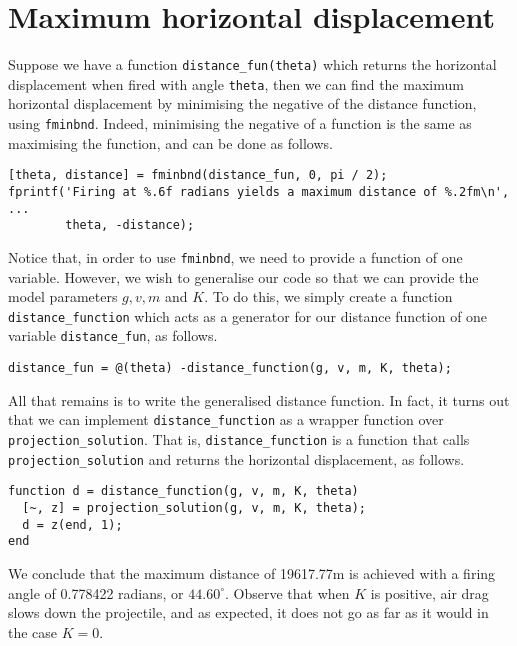 
\newpage
\section{Maximum horizontal displacement}

Suppose we have a function \lstinline|distance_fun(theta)| which returns the horizontal displacement when fired with angle \lstinline|theta|, then we can find the maximum horizontal displacement by minimising the negative of the distance function, using \lstinline|fminbnd|. Indeed, minimising the negative of a function is the same as maximising the function, and can be done as follows.

\begin{lstlisting}
[theta, distance] = fminbnd(distance_fun, 0, pi / 2);
fprintf('Firing at %.6f radians yields a maximum distance of %.2fm\n', ...
        theta, -distance);
\end{lstlisting}

\noindent
Notice that, in order to use \lstinline|fminbnd|, we need to provide a function of one variable. However, we wish to generalise our code so that we can provide the model parameters $g, v, m$ and $K$. To do this, we simply create a function \lstinline|distance_function| which acts as a generator for our distance function of one variable \lstinline|distance_fun|, as follows.
\begin{lstlisting}
distance_fun = @(theta) -distance_function(g, v, m, K, theta);
\end{lstlisting}

\noindent
All that remains is to write the generalised distance function. In fact, it turns out that we can implement \lstinline|distance_function| as a wrapper function over \lstinline|projection_solution|. That is, \lstinline|distance_function| is a function that calls \lstinline|projection_solution| and returns the horizontal displacement, as follows.
\begin{lstlisting}
function d = distance_function(g, v, m, K, theta)
  [~, z] = projection_solution(g, v, m, K, theta);
  d = z(end, 1);
end
\end{lstlisting}

\noindent
We conclude that the maximum distance of 19617.77m is achieved with a firing angle of 0.778422 radians, or $44.60^\circ$. Observe that when $K$ is positive, air drag slows down the projectile, and as expected, it does not go as far as it would in the case $K = 0$.

